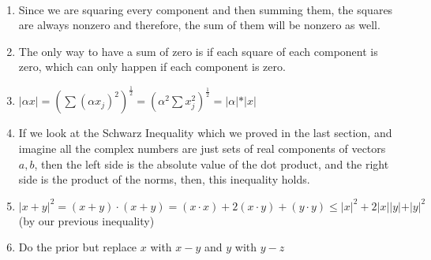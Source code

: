 \documentclass{article}
\begin{document}
\begin{customproof}
\

\begin{enumerate}
    \item Since we are squaring every component and then summing them, the squares are always nonzero and therefore, the sum of them will be nonzero as well.
    \item The only way to have a sum of zero is if each square of each component is zero, which can only happen if each component is zero.
    \item $ \vert \alpha x\vert = (\sum (\alpha x_j)^2)^\frac{1}{2} = (\alpha^2 \sum x_j^2 )^\frac{1}{2} = \vert \alpha \vert * \vert x \vert$
    \item If we look at the Schwarz Inequality which we proved in the last section, and imagine all the complex numbers are just sets of real components of vectors $a,b$, then the left side is the absolute value of the dot product, and the right side is the product of the norms, then, this inequality holds.
    \item $\vert x + y\vert^2 = (x+y) \cdot (x+y) = (x \cdot x) + 2 (x \cdot y) + (y \cdot y) \leq \vert x\vert^2 + 2 \vert x\vert \vert y\vert + \vert y\vert^2$ (by our previous inequality)
    \item Do the prior but replace $x$ with $x-y$ and $y$ with $y-z$            
\end{enumerate}
\end{customproof}
\end{document}

